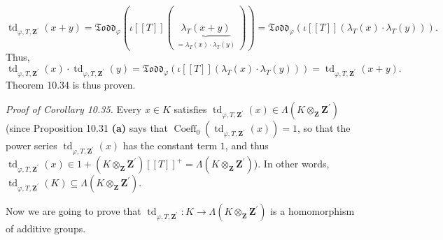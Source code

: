 \documentclass[numbers=enddot,12pt,final,onecolumn,notitlepage]{scrartcl}%
\begin{document}
\[
\operatorname*{td}\nolimits_{\varphi,T,\mathbf{Z}^{\prime}}\left(  x+y\right)
=\mathfrak{Todd}_{\varphi}\left(  \iota\left[  \left[  T\right]  \right]
\left(  \underbrace{\lambda_{T}\left(  x+y\right)  }_{\substack{=\lambda
_{T}\left(  x\right)  \cdot\lambda_{T}\left(  y\right)  }}\right)  \right)
=\mathfrak{Todd}_{\varphi}\left(  \iota\left[  \left[  T\right]  \right]
\left(  \lambda_{T}\left(  x\right)  \cdot\lambda_{T}\left(  y\right)
\right)  \right)  .
\]
Thus,%
\[
\operatorname*{td}\nolimits_{\varphi,T,\mathbf{Z}^{\prime}}\left(  x\right)
\cdot\operatorname*{td}\nolimits_{\varphi,T,\mathbf{Z}^{\prime}}\left(
y\right)  =\mathfrak{Todd}_{\varphi}\left(  \iota\left[  \left[  T\right]
\right]  \left(  \lambda_{T}\left(  x\right)  \cdot\lambda_{T}\left(
y\right)  \right)  \right)  =\operatorname*{td}\nolimits_{\varphi
,T,\mathbf{Z}^{\prime}}\left(  x+y\right)  .
\]
Theorem 10.34 is thus proven.

\textit{Proof of Corollary 10.35.} Every $x\in K$ satisfies
$\operatorname*{td}_{\varphi,T,\mathbf{Z}^{\prime}}\left(  x\right)
\in\Lambda\left(  K\otimes_{\mathbf{Z}}\mathbf{Z}^{\prime}\right)  $ (since
Proposition 10.31 \textbf{(a)} says that $\operatorname*{Coeff}\nolimits_{0}%
\left(  \operatorname*{td}\nolimits_{\varphi,T,\mathbf{Z}^{\prime}}\left(
x\right)  \right)  =1$, so that the power series $\operatorname*{td}%
\nolimits_{\varphi,T,\mathbf{Z}^{\prime}}\left(  x\right)  $ has the constant
term $1$, and thus $\operatorname*{td}\nolimits_{\varphi,T,\mathbf{Z}^{\prime
}}\left(  x\right)  \in1+\left(  K\otimes_{\mathbf{Z}}\mathbf{Z}^{\prime
}\right)  \left[  \left[  T\right]  \right]  ^{+}=\Lambda\left(
K\otimes_{\mathbf{Z}}\mathbf{Z}^{\prime}\right)  $). In other words,
$\operatorname*{td}_{\varphi,T,\mathbf{Z}^{\prime}}\left(  K\right)
\subseteq\Lambda\left(  K\otimes_{\mathbf{Z}}\mathbf{Z}^{\prime}\right)  $.

Now we are going to prove that $\operatorname*{td}_{\varphi,T,\mathbf{Z}%
^{\prime}}:K\rightarrow\Lambda\left(  K\otimes_{\mathbf{Z}}\mathbf{Z}^{\prime
}\right)  $ is a homomorphism of additive groups.
\end{document}
